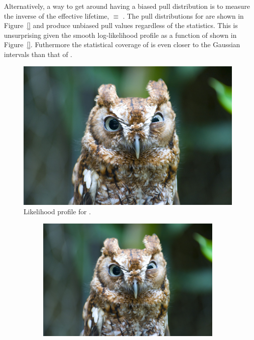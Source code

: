 {Alternatively, a way to get around having a biased pull distribution is to measure the inverse of the effective lifetime, \invtmumu$ \equiv$ \Gmumu. The pull distributions for \Gmumu are shown in Figure~\ref{} and produce unbiased pull values regardless of the statistics. This is unsurprising given the smooth log-likelihood profile as a function of \Gmumu shown in Figure~\ref{}. Futhermore the statistical coverage of \Gmumu is even closer to the Gaussian intervals than that of \tmumu.


\begin{figure}[htbp]
    \centering
        \includegraphics[width= 0.6 \textwidth]{./Figs/placeholder.jpeg}  
    \caption{Likelihood profile for \Gmumu.}
    \label{fig:gammalike}
\end{figure}

\begin{figure}[htbp]
    \centering
  \begin{subfigure}[b]{0.8\textwidth}
        \includegraphics[width= \textwidth]{./Figs/placeholder.jpeg}
    \end{subfigure}



\end{figure}}
